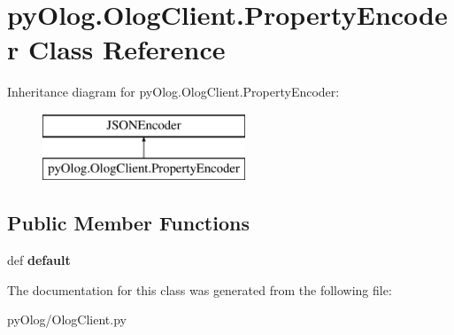 \hypertarget{classpyOlog_1_1OlogClient_1_1PropertyEncoder}{\section{py\-Olog.\-Olog\-Client.\-Property\-Encoder Class Reference}
\label{classpyOlog_1_1OlogClient_1_1PropertyEncoder}
}
Inheritance diagram for py\-Olog.\-Olog\-Client.\-Property\-Encoder\-:\begin{figure}[H]
\begin{center}
\leavevmode
\includegraphics[height=2.000000cm]{classpyOlog_1_1OlogClient_1_1PropertyEncoder}
\end{center}
\end{figure}
\subsection*{Public Member Functions}
\begin{DoxyCompactItemize}
\item 
\hypertarget{classpyOlog_1_1OlogClient_1_1PropertyEncoder_a1c61f64455f7a5a9338f63a7174e66a5}{def {\bfseries default}}\label{classpyOlog_1_1OlogClient_1_1PropertyEncoder_a1c61f64455f7a5a9338f63a7174e66a5}

\end{DoxyCompactItemize}


The documentation for this class was generated from the following file\-:\begin{DoxyCompactItemize}
\item 
py\-Olog/Olog\-Client.\-py\end{DoxyCompactItemize}
